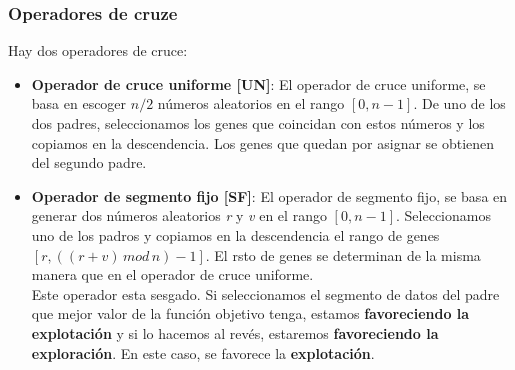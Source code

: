 \subsubsection{Operadores de cruze}
Hay dos operadores de cruce:
\begin{itemize}
   \item \textbf{Operador de cruce uniforme [UN]}: El operador de cruce uniforme, se basa en escoger $ n/2 $ números aleatorios en el rango $[0,n-1]$. De uno de los dos padres, seleccionamos los genes que coincidan con estos números y los copiamos en la descendencia. Los genes que quedan por asignar se obtienen del segundo padre.
   \item \textbf{Operador de segmento fijo [SF]}: El operador de segmento fijo, se basa en generar dos números aleatorios \emph{r} y \emph{v} en el rango $[0,n-1]$. Seleccionamos uno de los padros y copiamos en la descendencia el rango de genes $ [r,((r+v)\,mod\,n) - 1] $. El rsto de genes se determinan de la misma manera que en el operador de cruce uniforme.\\
   Este operador esta sesgado. Si seleccionamos el segmento de datos del padre que mejor valor de la función objetivo tenga, estamos \textbf{favoreciendo la explotación} y si lo hacemos al revés, estaremos \textbf{favoreciendo la exploración}. En este caso, se favorece la \textbf{explotación}.
\end{itemize}
\newpage
